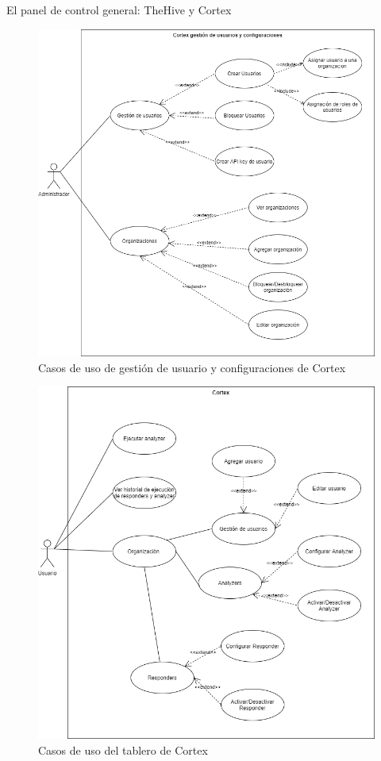 \begin{subsection}{El panel de control general: TheHive y Cortex}
\begin{figure}[H]
        \includegraphics[width=1\textwidth]{./iteracion_1_imagenes/figura_30_cortex_user_conf.png}
        \caption{Casos de uso de gestión de usuario y configuraciones de Cortex}
        \label{fig:caso_de_uso_gestion_usuarios_configuraciones_cortex}
     \end{figure}
     \begin{figure}[H]
      \centering
      \includegraphics[width=1\textwidth]{./iteracion_1_imagenes/figura_31_cortex_tablero.png}
        \caption{Casos de uso del tablero de Cortex}
        \label{fig:caso_de_uso_tablero_cortex}
     \end{figure}
     
     
   \end{subsection}

